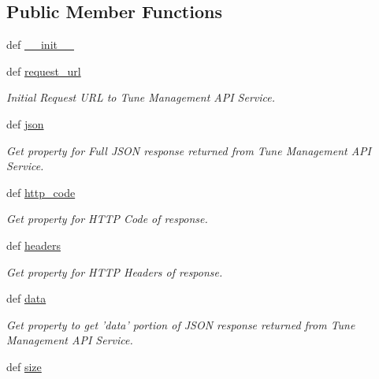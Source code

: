 \subsection*{Public Member Functions}
\begin{DoxyCompactItemize}
\item 
def \hyperlink{classtune_1_1management_1_1service_1_1response_1_1Response_aaef1dd19afa1fdf82f71b4f0bc9626c5}{\-\_\-\-\_\-init\-\_\-\-\_\-}
\item 
def \hyperlink{classtune_1_1management_1_1service_1_1response_1_1Response_afa11fd38f621b34e4a07f070247d2607}{request\-\_\-url}
\begin{DoxyCompactList}\small\item\em Initial Request U\-R\-L to Tune Management A\-P\-I Service. \end{DoxyCompactList}\item 
def \hyperlink{classtune_1_1management_1_1service_1_1response_1_1Response_af5eb053601c88f96cc166a7c1f043e1d}{json}
\begin{DoxyCompactList}\small\item\em Get property for Full J\-S\-O\-N response returned from Tune Management A\-P\-I Service. \end{DoxyCompactList}\item 
def \hyperlink{classtune_1_1management_1_1service_1_1response_1_1Response_a5a0beea3d6dc7a87f5852223cbdb81d4}{http\-\_\-code}
\begin{DoxyCompactList}\small\item\em Get property for H\-T\-T\-P Code of response. \end{DoxyCompactList}\item 
def \hyperlink{classtune_1_1management_1_1service_1_1response_1_1Response_ac2b687a8ea401d4eec918938c2b31eef}{headers}
\begin{DoxyCompactList}\small\item\em Get property for H\-T\-T\-P Headers of response. \end{DoxyCompactList}\item 
def \hyperlink{classtune_1_1management_1_1service_1_1response_1_1Response_a489487dfd2da9439a947c610d7dbe7e2}{data}
\begin{DoxyCompactList}\small\item\em Get property to get 'data' portion of J\-S\-O\-N response returned from Tune Management A\-P\-I Service. \end{DoxyCompactList}\item 
def \hyperlink{classtune_1_1management_1_1service_1_1response_1_1Response_a99753d93283d6e77089d28fca9959f02}{size}

\end{DoxyCompactItemize}
